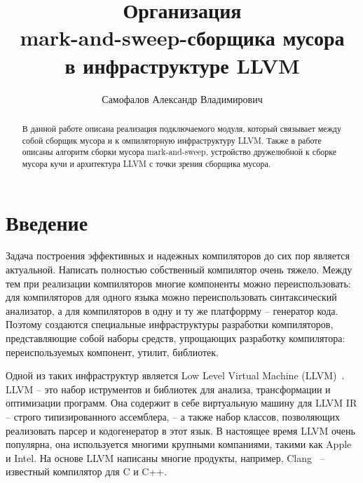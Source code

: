 \title{Организация\\
mark-and-sweep-сборщика мусора\\
в инфраструктуре LLVM}
%
\author{Самофалов Александр Владимирович}
%
%

%
%

\maketitle              %

\begin{abstract}
В данной работе описана реализация подключаемого модуля, который связывает между собой сборщик мусора и к
омпиляторную инфраструктуру LLVM. Также в работе описаны алгоритм сборки мусора mark-and-sweep, устройство 
дружелюбной к сборке мусора кучи и архитектура LLVM с точки зрения сборщика мусора.
\end{abstract}
%

\section*{Введение}
Задача построения эффективных и надежных компиляторов до сих пор является актуальной. Написать полностью собственный компилятор очень тяжело. Между тем при реализации компиляторов многие компоненты можно переиспользовать: для компиляторов для одного языка можно переиспользовать синтаксический анализатор, а для компиляторов в одну и ту же платфоррму -- генератор кода. Поэтому создаются специальные инфраструктуры разработки компиляторов, представляющие собой наборы средств, упрощающих разработку компилятора: переиспользуемых компонент, утилит, библиотек.

Одной из таких инфраструктур является Low Level Virtual Machine (LLVM)~\cite{llvm}. LLVM -- это набор иструментов и библиотек для анализа, трансформации и оптимизации программ. Она содержит в себе виртуальную машину для LLVM IR -- строго типизированного ассемблера, -- а также набор классов, позволяющих реализовать парсер и кодогенератор в этот язык. В настоящее время LLVM очень популярна, она используется многими крупными компаниями, такими как Apple и Intel. На основе LLVM написаны многие продукты, например, Clang~\cite{clang} -- известный компилятор для C и C++.

